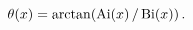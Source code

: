 \[\mathop{\theta\/}\nolimits\!\left(x\right)=\mathop{\mathrm{arctan}\/}\nolimits%
\!\left(\mathop{\mathrm{Ai}\/}\nolimits\!\left(x\right)/\mathop{\mathrm{Bi}\/}%
\nolimits\!\left(x\right)\right).\]